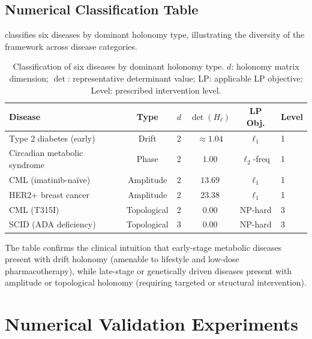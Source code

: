 \subsection{Numerical Classification Table}

 classifies six diseases by dominant
holonomy type, illustrating the diversity of the framework across disease
categories.

\begin{table}[htbp]
\centering
\caption{Classification of six diseases by dominant holonomy type.
$d$: holonomy matrix dimension; $\det$: representative determinant value;
LP: applicable LP objective; Level: prescribed intervention level.}
\label{tab:ch10-holonomy-classification}
\small
\begin{tabular}{lccccl}
\toprule
\textbf{Disease} & \textbf{Type} & $d$ & $\det(H_\ell)$ & \textbf{LP Obj.} & \textbf{Level} \\
\midrule
Type 2 diabetes (early)       & Drift     & 2 & $\approx 1.04$ & $\ell_1$ & 1 \\
Circadian metabolic syndrome  & Phase     & 2 & $1.00$         & $\ell_2$-freq & 1 \\
CML (imatinib-na\"{i}ve)     & Amplitude & 2 & $13.69$        & $\ell_1$ & 1 \\
HER2+ breast cancer           & Amplitude & 2 & $23.38$        & $\ell_1$ & 1 \\
CML (T315I)                   & Topological & 2 & $0.00$       & NP-hard  & 3 \\
SCID (ADA deficiency)         & Topological & 3 & $0.00$       & NP-hard  & 3 \\
\bottomrule
\end{tabular}
\end{table}

The table confirms the clinical intuition that early-stage metabolic diseases
present with drift holonomy (amenable to lifestyle and low-dose pharmacotherapy),
while late-stage or genetically driven diseases present with amplitude or
topological holonomy (requiring targeted or structural intervention).

\section{Numerical Validation Experiments}
\label{sec:ch10-numerical}

